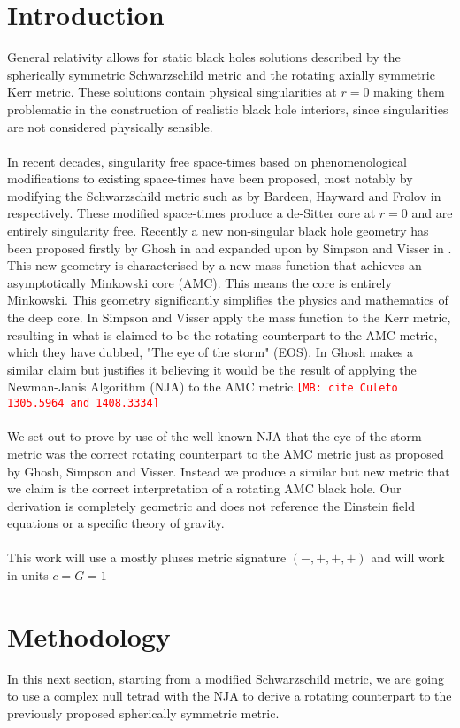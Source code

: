 \documentclass[12pt]{iopart}
\def\mbc#1{\textcolor{red}{\tt[MB: #1]}}
\begin{document}
\section{Introduction}
General relativity allows for static black holes solutions described by the spherically symmetric Schwarzschild metric and the rotating axially symmetric Kerr metric. These solutions contain physical singularities at $r=0$ making them problematic in the construction of realistic black hole interiors, since singularities are not considered physically sensible.
\\
\\
In recent decades, singularity free space-times based on phenomenological modifications to existing space-times have been proposed, most notably by modifying the Schwarzschild metric such as by Bardeen, Hayward and Frolov in \cite{Bardeen:1968} \cite{Hayward:2005gi} \cite{Frolov:2016pav} respectively. These modified space-times produce a de-Sitter core at $r=0$ and are entirely singularity free. Recently a new non-singular black hole geometry has been proposed firstly by Ghosh in \cite{Ghosh:2014pba} and expanded upon by Simpson and Visser in \cite{Simpson:2019mud}. This new geometry is characterised by a new mass function that achieves an asymptotically Minkowski core (AMC). This means the core is entirely Minkowski. This geometry significantly simplifies the physics and mathematics of the deep core. In \cite{Simpson:2021dyo} Simpson and Visser apply the mass function to the Kerr metric, resulting in what is claimed to be the rotating counterpart to the AMC metric, which they have dubbed, "The eye of the storm" (EOS). In \cite{Ghosh:2014pba} Ghosh makes a similar claim but justifies it believing it would be the result of applying the Newman-Janis Algorithm (NJA) to the AMC metric.\mbc{cite Culeto 1305.5964 and 1408.3334}
\\
\\
We set out to prove by use of the well known NJA that the eye of the storm metric was the correct rotating counterpart to the AMC metric just as proposed by Ghosh, Simpson and Visser. Instead we produce a similar but new metric that we claim is the correct interpretation of a rotating AMC black hole. Our derivation is completely geometric and does not reference the Einstein field equations or a specific theory of gravity.
\\
\\
This work will use a mostly pluses metric signature $(−,+,+,+)$ and will work in units $c = G = 1$
\section{Methodology}
In this next section, starting from a modified Schwarzschild metric, we are going to use a complex null tetrad with the NJA to derive a rotating counterpart to the previously proposed spherically symmetric metric.
\end{document}
